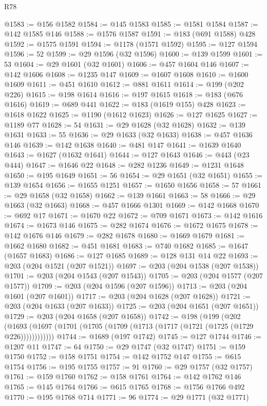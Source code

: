\begin{lexlean}{R78}
\begin{coremodule}
@1583 := @156 @1582
@1584 := @145 @1583
@1585 := @1581 @1584
@1587 := @142 @1585 @146
@1588 := @1576 @1587
@1591 := @183 (@691 @1588) @428
@1592 := @1575 @1591
@1594 := @1178 (@1571 @1592)
@1595 := @127 @1594
@1596 := 52
@1599 := @29 @1596 (@32 @1596)
@1600 := @139 @1599
@1601 := 53
@1604 := @29 @1601 (@32 @1601)
@1606 := @457 @1604 @146
@1607 := @142 @1606
@1608 := @1235 @147
@1609 := @1607 @1608
@1610 := @1600 @1609
@1611 := @451 @1610
@1612 := @881 @1611
@1614 := @199 (@202 @226)
@1615 := @198 @1614
@1616 := @197 @1615
@1618 := @183 (@676 @1616)
@1619 := @689 @441
@1622 := @183 (@1619 @155) @428
@1623 := @1618 @1622
@1625 := @1190 (@1612 @1623)
@1626 := @127 @1625
@1627 := @1189 @77
@1628 := 54
@1631 := @29 @1628 (@32 @1628)
@1632 := @139 @1631
@1633 := 55
@1636 := @29 @1633 (@32 @1633)
@1638 := @457 @1636 @146
@1639 := @142 @1638
@1640 := @481 @147
@1641 := @1639 @1640
@1643 := @1627 (@1632 @1641)
@1644 := @127 @1643
@1646 := @443 (@23 @444)
@1647 := @1646 @22
@1648 := @282 @1236
@1649 := @1231 @1648
@1650 := @195 @1649
@1651 := 56
@1654 := @29 @1651 (@32 @1651)
@1655 := @139 @1654
@1656 := @1655 @1251
@1657 := @1650 @1656
@1658 := 57
@1661 := @29 @1658 (@32 @1658)
@1662 := @139 @1661
@1663 := 58
@1666 := @29 @1663 (@32 @1663)
@1668 := @457 @1666 @1301
@1669 := @142 @1668
@1670 := @692 @17
@1671 := @1670 @22
@1672 := @709 @1671
@1673 := @142 @1616
@1674 := @1673 @146
@1675 := @282 @1674
@1676 := @1672 @1675
@1678 := @142 @1676 @146
@1679 := @282 @1678
@1680 := @1669 @1679
@1681 := @1662 @1680
@1682 := @451 @1681
@1683 := @740 @1682
@1685 := @1647 (@1657 @1683)
@1686 := @127 @1685
@1689 := @128 @131 @14 @22
@1693 := @203 (@204 @1521 (@207 @1521))
@1697 := @203 (@204 @1538 (@207 @1538))
@1701 := @203 (@204 @1543 (@207 @1543))
@1705 := @203 (@204 @1577 (@207 @1577))
@1709 := @203 (@204 @1596 (@207 @1596))
@1713 := @203 (@204 @1601 (@207 @1601))
@1717 := @203 (@204 @1628 (@207 @1628))
@1721 := @203 (@204 @1633 (@207 @1633))
@1725 := @203 (@204 @1651 (@207 @1651))
@1729 := @203 (@204 @1658 (@207 @1658))
@1742 := @198
    (@199
      (@202 (@1693 (@1697 (@1701 (@1705 (@1709 (@1713 (@1717 (@1721 (@1725 (@1729 @226))))))))))))
@1744 := @1689 (@197 @1742)
@1745 := @127 @1744
@1746 := @1207 @11
@1747 := 64
@1750 := @29 @1747 (@32 @1747)
@1751 := @159 @1750
@1752 := @158 @1751
@1754 := @142 @1752 @147
@1755 := @615 @1754
@1756 := @195 @1755
@1757 := 91
@1760 := @29 @1757 (@32 @1757)
@1761 := @159 @1760
@1762 := @158 @1761
@1764 := @142 @1762 @146
@1765 := @145 @1764
@1766 := @615 @1765
@1768 := @1756 @1766 @492
@1770 := @195 @1768 @714
@1771 := 96
@1774 := @29 @1771 (@32 @1771)

\end{coremodule}
\end{lexlean}

